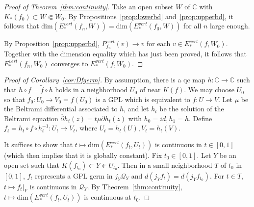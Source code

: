 \documentclass{amsart}
\numberwithin{equation}{section}
\newcommand{\C}{\mathbb C}
\theoremstyle{definition}
\theoremstyle{remark}
\begin{document}
\begin{proof}[Proof of Theorem~\ref{thm:continuity}]
Take an open subset $W$ of $\C$ with $K_*(f_0)\subset W\Subset W_0$. By Propositions~\ref{prop:lowerbd} and~\ref{prop:upperbd}, it follows that $\text{dim}(E^{vert}_*(f_n,W))=\text{dim}(E^{vert}_*(f_0,W))$ for all $n$ large enough. 

By Proposition~\ref{prop:upperbd}, $P^{vert}_{f_n}(v)\to v$ for each $v\in E^{vert}_*(f,W_0)$. Together with the dimension equality which has just been proved, it follows that $E^{vert}_*(f_n,W_0)$ converges to $E^{vert}_*(f,W_0)$.
\end{proof}

\begin{proof}[Proof of Corollary~\ref{cor:Dfgerm}] 
By assumption, there is 
a qc map $h: \mathbb{C}\to\mathbb{C}$ such that $h\circ f=\widetilde{f}\circ h$ holds in a neighborhood $U_0$ of near $K(f)$. We may choose $U_0$ so that $f_0: U_0\to V_0=f(U_0)$ is a GPL which is equivalent to $f:U\to V$.  Let $\mu$ be the Beltrami differential associated to $h$, 
and let $h_t$ be the solution of the Beltrami equation $\overline{\partial} h_t(z)=t\mu \partial h_t(z)$ with $h_0=id, h_1=h$. Define $f_t=h_t\circ f\circ h_t^{-1}: U_t\to V_t$, where $U_t=h_t(U), V_t=h_t(V)$.   

It suffices to show that $t\mapsto \text{dim}(E^{vert}_*(f_t, U_t))$ is continuous in $t\in [0,1]$ (which then implies that it is globally constant). 
Fix $t_0 \in [0,1]$. Let $Y$ be an open set such that $K(f_{t_0})\subset Y\Subset U_{t_0}$. Then in a small neighborhood $T$ of $t_0$ in $[0,1]$, $f_t$ represents a GPL germ in $j_Y\mathcal{Q}_Y$ and $d(j_Y f_t)=d(j_Y f_{t_0})$. For $t\in T$, $t\mapsto f_t|_Y$ is continuous in $\mathcal{Q}_Y$. By Theorem~\ref{thm:continuity}, $t\mapsto \text{dim}(E^{vert}_*(f_t,U_t))$ is continuous at $t_0$.
\end{proof}
\end{document}
